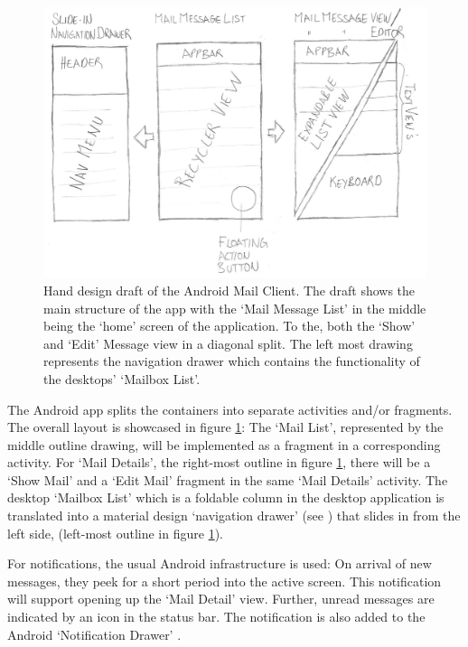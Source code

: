 \documentclass[a4paper,11pt,twoside]{article}
\begin{document}
\begin{figure}
    \includegraphics[width=1\textwidth]{hand_design.png}
    \caption{Hand design draft of the Android Mail Client. The draft shows the
    main structure of the app with the `Mail Message List' in the middle being
    the `home' screen of the application. To the, both the `Show' and `Edit'
    Message view in a diagonal split. The left most drawing represents the
    navigation drawer which contains the functionality of the desktops'
    `Mailbox List'.}
    \label{fig:hand_design}
\end{figure}

The Android app splits the containers into separate activities and/or
fragments. The overall layout is showcased in figure \ref{fig:hand_design}:
The `Mail List', represented by the middle outline drawing, will be implemented
as a fragment in a corresponding activity. For `Mail Details', the right-most outline in
figure \ref{fig:hand_design}, there will be a `Show Mail' and a `Edit Mail'
fragment in the same `Mail Details' activity. The desktop `Mailbox List' which
is a foldable column in the desktop application is translated into a material
design `navigation drawer' (see \cite{navigation_drawer}) that slides in from
the left side, (left-most outline in figure \ref{fig:hand_design}).

For notifications, the usual Android infrastructure is used: On arrival of new
messages, they peek for a short period into the active screen. This notification will
support opening up the `Mail Detail' view.  Further, unread messages are
indicated by an icon in the status bar. The notification is also added to the
Android `Notification Drawer' \cite{android_notifications}.
\end{document}
